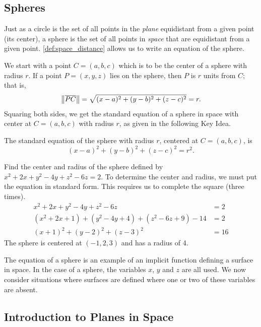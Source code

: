 \subsection{Spheres}

Just as a circle is the set of all points in the \emph{plane} equidistant from a given point (its center), a sphere is the set of all points in \emph{space} that are equidistant from a given point. \autoref{def:space_distance} allows us to write an equation of the sphere.

We start with a point $C = (a,b,c)$ which is to be the center of a sphere with radius $r$. If a point $P=(x,y,z)$ lies on the sphere, then $P$ is $r$ units from $C$; that is, 
\[\left\lVert \overline{PC} \right\rVert= \sqrt{(x-a)^2+(y-b)^2+(z-c)^2} = r.\]
Squaring both sides, we get the standard equation of a sphere in space with center at $C=(a,b,c)$ with radius $r$, as given in the following Key Idea.

\begin{keyidea}\label{idea:sphere}%
The standard equation of the sphere with radius $r$, centered at $C=(a,b,c)$, is
\[(x-a)^2+(y-b)^2+(z-c)^2=r^2.\]
\end{keyidea}


\begin{example}\label{ex_space2}%
Find the center and radius of the sphere defined by $x^2+2x+y^2-4y+z^2-6z=2$.
\solution
To determine the center and radius, we must put the equation in standard form. This requires us to complete the square (three times).
\begin{align*}
x^2+2x+y^2-4y+z^2-6z&=2 \\
(x^2+2x+1) + (y^2-4y+4)+ (z^2-6z+9) - 14 &= 2\\
(x+1)^2 + (y-2)^2 + (z-3)^2 &= 16
\end{align*}
The sphere is centered at $(-1,2,3)$ and has a radius of 4.
\end{example}

The equation of a sphere is an example of an implicit function defining a surface in space. In the case of a sphere, the variables $x$, $y$ and $z$ are all used. We now consider situations where surfaces are defined where one or two of these variables are absent.

\subsection{Introduction to Planes in Space}

